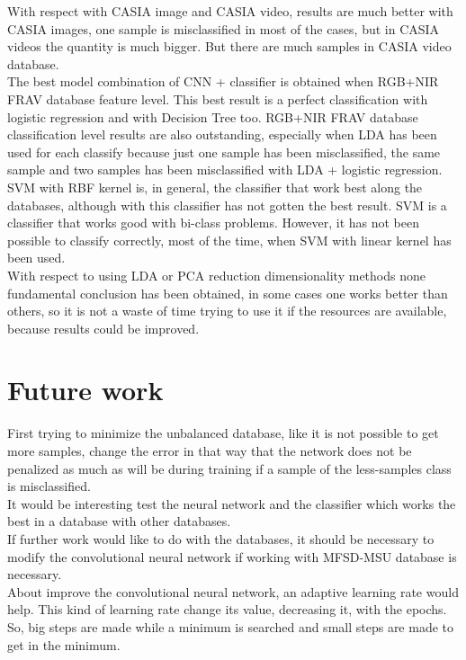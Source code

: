 With respect with CASIA image and CASIA video, results are much better with CASIA images, one sample is misclassified in most of the cases, but in CASIA videos the quantity is much bigger. But there are much samples in CASIA video database.\\

The best model combination of CNN + classifier is obtained when RGB+NIR FRAV database feature level. This best result is a perfect classification with logistic regression and with Decision Tree too. RGB+NIR FRAV database classification level results are also outstanding, especially when LDA has been used for each classify because just one sample has been misclassified, the same sample and two samples has been misclassified with LDA + logistic regression.\\

SVM with RBF kernel is, in general, the classifier that work best along the databases, although with this classifier has not gotten the best result. SVM is a classifier that works good with bi-class problems. However, it has not been possible to classify correctly, most of the time, when SVM with linear kernel has been used.\\

With respect to using LDA or PCA reduction dimensionality methods none fundamental conclusion has been obtained, in some cases one works better than others, so it is not a waste of time trying to use it if the resources are available, because results could be improved.\\


\section{Future work}
First trying to minimize the unbalanced database, like it is not possible to get more samples, change the error in that way that the network does not be penalized as much as will be during training if a sample of the less-samples class  is misclassified.\\

It would be interesting test the neural network and the classifier which works the best in a database with other databases. \\

If further work would like to do with the databases, it should be necessary to modify the convolutional neural network if working with MFSD-MSU database is necessary.\\

About improve the convolutional neural network, an adaptive learning rate would help. This kind of learning rate change its value, decreasing it, with the epochs. So, big steps are made while a minimum is searched and small steps are made to get in the minimum.\\
